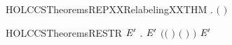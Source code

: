\begin{SaveVerbatim}{HOLCCSTheoremsREPXXRelabelingXXTHM}
\HOLTokenTurnstile{} \HOLSymConst{\HOLTokenForall{}}.  \ensuremath{(} \ensuremath{)}
\end{SaveVerbatim}
\newcommand{\HOLCCSTheoremsREPXXRelabelingXXTHM}{\UseVerbatim{HOLCCSTheoremsREPXXRelabelingXXTHM}}
\begin{SaveVerbatim}{HOLCCSTheoremsRESTR}
\HOLTokenTurnstile{} \HOLSymConst{\HOLTokenForall{}}  \ensuremath{\HOLBoundVar{E}\sp{\prime{}}}  .
      \HOLTokenTransBegin{}\HOLTokenTransEnd \ensuremath{\HOLBoundVar{E}\sp{\prime{}}} \HOLSymConst{\HOLTokenConj{}} \ensuremath{(}\ensuremath{(} \HOLSymConst{\ensuremath{=}} \HOLConst{\ensuremath{\tau}}\ensuremath{)} \HOLSymConst{\HOLTokenDisj{}} \ensuremath{(} \HOLSymConst{\ensuremath{=}}  \ensuremath{)} \HOLSymConst{\HOLTokenConj{}}  \HOLConst{\HOLTokenNotIn{}}  \HOLSymConst{\HOLTokenConj{}}   \HOLConst{\HOLTokenNotIn{}} \ensuremath{)} \HOLSymConst{\HOLTokenImp{}}
        \HOLTokenTransBegin{}\HOLTokenTransEnd {}  \ensuremath{\HOLBoundVar{E}\sp{\prime{}}}
\end{SaveVerbatim}
\newcommand{\HOLCCSTheoremsRESTR}{\UseVerbatim{HOLCCSTheoremsRESTR}}
